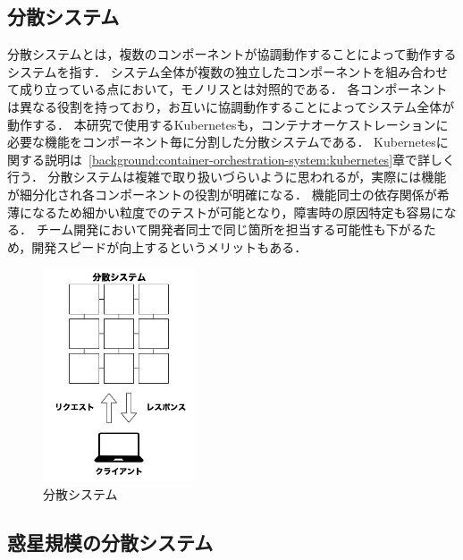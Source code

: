 \subsection{分散システム}
\label{bg:definition:distributed-system}

分散システムとは，複数のコンポーネントが協調動作することによって動作するシステムを指す．
システム全体が複数の独立したコンポーネントを組み合わせて成り立っている点において，モノリスとは対照的である．
各コンポーネントは異なる役割を持っており，お互いに協調動作することによってシステム全体が動作する．
本研究で使用するKubernetesも，コンテナオーケストレーションに必要な機能をコンポーネント毎に分割した分散システムである．
Kubernetesに関する説明は~\ref{background:container-orchestration-system:kubernetes}章で詳しく行う．
分散システムは複雑で取り扱いづらいように思われるが，実際には機能が細分化され各コンポーネントの役割が明確になる．
機能同士の依存関係が希薄になるため細かい粒度でのテストが可能となり，障害時の原因特定も容易になる．
チーム開発において開発者同士で同じ箇所を担当する可能性も下がるため，開発スピードが向上するというメリットもある．

\begin{figure}[htbp]
\begin{center}
    \includegraphics[width=0.4\textwidth]{./figures/distributed-system.jpg}
    \caption{分散システム}
\end{center}
\end{figure}

\subsection{惑星規模の分散システム}
\label{bg:definition:planetary-scale-distributed-system}

